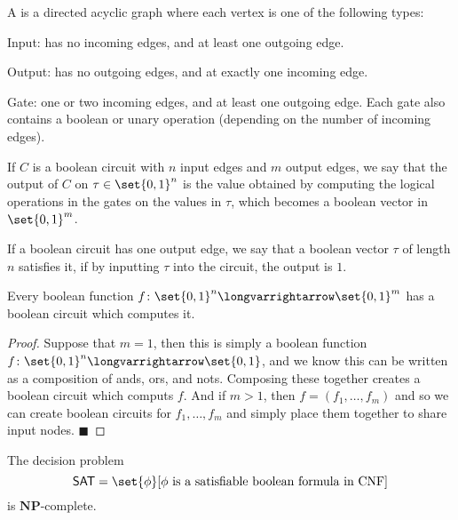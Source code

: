 \documentclass[10pt]{article}
\let\longto=\longvarrightarrow
\def\sat{\textsf{SAT}}
\def\NP{\mathbf{NP}}
\def\qed{%
    \ifmmode%
        \eqno\blacksquare%
    \else%
        \hskip1cm\allowbreak\hbox{}\nobreak\hfill$\blacksquare$%
    \fi%
}
\begin{document}
\begin{defn*}

    A  is a directed acyclic graph where each vertex is one of the following types:
    \benum
        \item Input: has no incoming edges, and at least one outgoing edge.
        \item Output: has no outgoing edges, and at exactly one incoming edge.
        \item Gate: one or two incoming edges, and at least one outgoing edge.
    \eenum
    Each gate also contains a boolean or unary operation (depending on the number of incoming edges).

    If $C$ is a boolean circuit with $n$ input edges and $m$ output edges, we say that the output of $C$ on $\tau\in\set{0,1}^n$ is the value obtained by computing the logical operations in the gates on
    the values in $\tau$, which becomes a boolean vector in $\set{0,1}^m$.

    If a boolean circuit has one output edge, we say that a boolean vector $\tau$ of length $n$ satisfies it, if by inputting $\tau$ into the circuit, the output is $1$.

\end{defn*}

\begin{lemm*}

    Every boolean function $f\colon\set{0,1}^n\longto\set{0,1}^m$ has a boolean circuit which computes it.

\end{lemm*}

\begin{proof}

    Suppose that $m=1$, then this is simply a boolean function $f\colon\set{0,1}^n\longto\set{0,1}$, and we know this can be written as a composition of ands, ors, and nots.
    Composing these together creates a boolean circuit which computs $f$.
    And if $m>1$, then $f=(f_1,\dots,f_m)$ and so we can create boolean circuits for $f_1,\dots,f_m$ and simply place them together to share input nodes.
    \qed

\end{proof}

\begin{thrm*}

    The decision problem
    \[ \sat = \set{\phi}[\text{$\phi$ is a satisfiable boolean formula in CNF}] \]
    is $\NP$-complete.

\end{thrm*}
\end{document}
